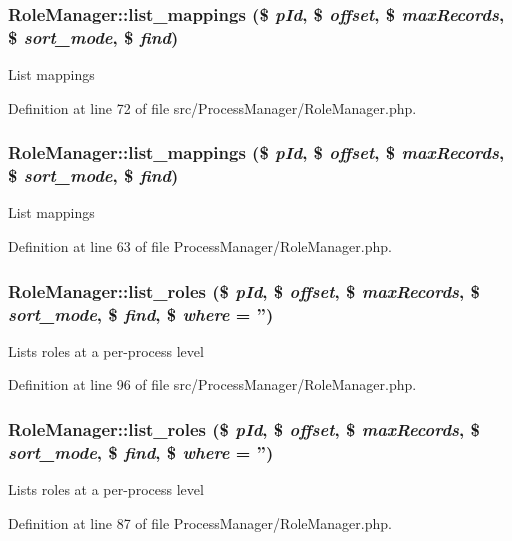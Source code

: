 \subsubsection{\setlength{\rightskip}{0pt plus 5cm}Role\-Manager::list\_\-mappings (\$ {\em p\-Id}, \$ {\em offset}, \$ {\em max\-Records}, \$ {\em sort\_\-mode}, \$ {\em find})}\label{classRoleManager_a13}


List mappings 

Definition at line 72 of file src/Process\-Manager/Role\-Manager.php.
\subsubsection{\setlength{\rightskip}{0pt plus 5cm}Role\-Manager::list\_\-mappings (\$ {\em p\-Id}, \$ {\em offset}, \$ {\em max\-Records}, \$ {\em sort\_\-mode}, \$ {\em find})}\label{classRoleManager_a4}


List mappings 

Definition at line 63 of file Process\-Manager/Role\-Manager.php.
\subsubsection{\setlength{\rightskip}{0pt plus 5cm}Role\-Manager::list\_\-roles (\$ {\em p\-Id}, \$ {\em offset}, \$ {\em max\-Records}, \$ {\em sort\_\-mode}, \$ {\em find}, \$ {\em where} = '')}\label{classRoleManager_a14}


Lists roles at a per-process level 

Definition at line 96 of file src/Process\-Manager/Role\-Manager.php.
\subsubsection{\setlength{\rightskip}{0pt plus 5cm}Role\-Manager::list\_\-roles (\$ {\em p\-Id}, \$ {\em offset}, \$ {\em max\-Records}, \$ {\em sort\_\-mode}, \$ {\em find}, \$ {\em where} = '')}\label{classRoleManager_a5}


Lists roles at a per-process level 

Definition at line 87 of file Process\-Manager/Role\-Manager.php.
